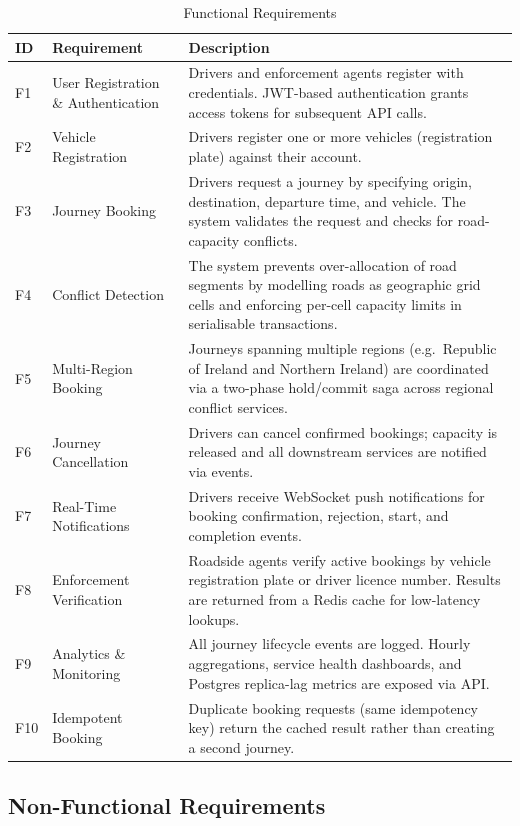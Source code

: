 \documentclass[12pt,a4paper]{article}
\begin{document}
\begin{table}[H]
\centering
\small
\caption{Functional Requirements}
\begin{tabularx}{\textwidth}{C{0.6cm} L{3.5cm} X}
  \toprule
  \textbf{ID} & \textbf{Requirement} & \textbf{Description} \\
  \midrule
  F1 & User Registration \& Authentication & Drivers and enforcement agents register with credentials. JWT-based authentication grants access tokens for subsequent API calls. \\
  F2 & Vehicle Registration & Drivers register one or more vehicles (registration plate) against their account. \\
  F3 & Journey Booking & Drivers request a journey by specifying origin, destination, departure time, and vehicle. The system validates the request and checks for road-capacity conflicts. \\
  F4 & Conflict Detection & The system prevents over-allocation of road segments by modelling roads as geographic grid cells and enforcing per-cell capacity limits in serialisable transactions. \\
  F5 & Multi-Region Booking & Journeys spanning multiple regions (e.g.\ Republic of Ireland and Northern Ireland) are coordinated via a two-phase hold/commit saga across regional conflict services. \\
  F6 & Journey Cancellation & Drivers can cancel confirmed bookings; capacity is released and all downstream services are notified via events. \\
  F7 & Real-Time Notifications & Drivers receive WebSocket push notifications for booking confirmation, rejection, start, and completion events. \\
  F8 & Enforcement Verification & Roadside agents verify active bookings by vehicle registration plate or driver licence number. Results are returned from a Redis cache for low-latency lookups. \\
  F9 & Analytics \& Monitoring & All journey lifecycle events are logged. Hourly aggregations, service health dashboards, and Postgres replica-lag metrics are exposed via API. \\
  F10 & Idempotent Booking & Duplicate booking requests (same idempotency key) return the cached result rather than creating a second journey. \\
  \bottomrule
\end{tabularx}
\end{table}

\subsection{Non-Functional Requirements}
\end{document}
